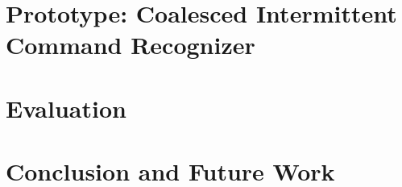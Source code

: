 \documentclass[sigconf]{acmart}
\newcommand{\todo}[1]{}
\renewcommand{\todo}[1]{{\color{red} [{#1}]}}
\begin{document}
\section{Prototype: Coalesced Intermittent Command Recognizer}
\label{sec:disMic}


\section{Evaluation}
\label{sec:evaluation}



% 




\section{Conclusion and Future Work}





\end{document}
